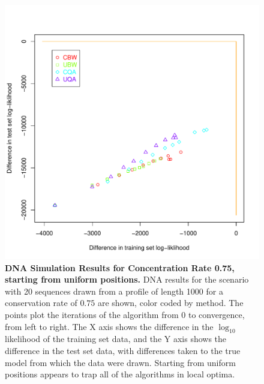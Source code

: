 \documentclass[preprint,12pt,authoryear]{elsarticle}
\begin{document}
\begin{figure}[htp]
\centering
\includegraphics[scale=.85]{DNA_uniformstart_results_75.pdf}
\caption{\textbf{DNA Simulation Results for Concentration Rate 0.75, starting from uniform positions.}  DNA results for the scenario with 20 sequences drawn from a profile of length 1000 for a conservation rate of $0.75$ are shown, color coded by method.  The points plot the iterations of the algorithm from 0 to convergence, from left to right.  The X axis shows the difference in the $\log_{10}$ likelihood of the training set data, and the Y axis shows the difference in the test set data, with differences taken to the true model from which the data were drawn.  Starting from uniform positions appears to trap all of the algorithms in local optima.}
\label{fig:DNA_uniformstart_results_75}
\end{figure}
\end{document}
